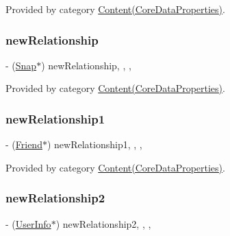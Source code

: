 Provided by category \hyperlink{category_content_07_core_data_properties_08_a2889370c08c2aa08de72518277c7a72f}{Content(\+Core\+Data\+Properties)}.

\hypertarget{interface_content_a9fe9cbddf7a12d3fae374d6a0f20967a}{}\label{interface_content_a9fe9cbddf7a12d3fae374d6a0f20967a} 
\subsubsection{\texorpdfstring{new\+Relationship}{newRelationship}}
{\footnotesize\ttfamily -\/ (\hyperlink{interface_snap}{Snap}$\ast$) new\+Relationship\hspace{0.3cm}{\ttfamily [read]}, {\ttfamily [write]}, {\ttfamily [nonatomic]}, {\ttfamily [retain]}}



Provided by category \hyperlink{category_content_07_core_data_properties_08_a9fe9cbddf7a12d3fae374d6a0f20967a}{Content(\+Core\+Data\+Properties)}.

\hypertarget{interface_content_acdbcc4a73539ea8120df429fff076ae4}{}\label{interface_content_acdbcc4a73539ea8120df429fff076ae4} 
\subsubsection{\texorpdfstring{new\+Relationship1}{newRelationship1}}
{\footnotesize\ttfamily -\/ (\hyperlink{interface_friend}{Friend}$\ast$) new\+Relationship1\hspace{0.3cm}{\ttfamily [read]}, {\ttfamily [write]}, {\ttfamily [nonatomic]}, {\ttfamily [retain]}}



Provided by category \hyperlink{category_content_07_core_data_properties_08_acdbcc4a73539ea8120df429fff076ae4}{Content(\+Core\+Data\+Properties)}.

\hypertarget{interface_content_a548aaf829a86fcdfdbe44b8c1964340e}{}\label{interface_content_a548aaf829a86fcdfdbe44b8c1964340e} 
\subsubsection{\texorpdfstring{new\+Relationship2}{newRelationship2}}
{\footnotesize\ttfamily -\/ (\hyperlink{interface_user_info}{User\+Info}$\ast$) new\+Relationship2\hspace{0.3cm}{\ttfamily [read]}, {\ttfamily [write]}, {\ttfamily [nonatomic]}, {\ttfamily [retain]}}




